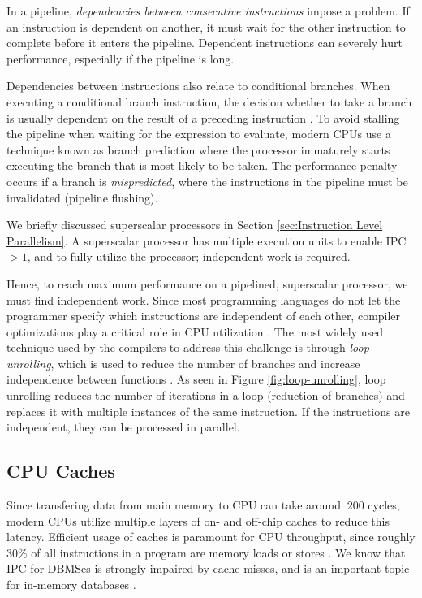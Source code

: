 In a pipeline, \textit{dependencies between consecutive instructions} impose a problem. If an instruction is dependent on another, it must wait for the other instruction to complete before it enters the pipeline. Dependent instructions can severely hurt performance, especially if the pipeline is long.

Dependencies between instructions also relate to conditional branches. When executing a conditional branch instruction, the decision whether to take a branch is usually dependent on the result of a preceding instruction \cite{Boncz2005-wj}. To avoid stalling the pipeline when waiting for the expression to evaluate, modern CPUs use a technique known as branch prediction where the processor immaturely starts executing the branch that is most likely to be taken. The performance penalty occurs if a branch is \textit{mispredicted}, where the instructions in the pipeline must be invalidated (pipeline flushing).

We briefly discussed superscalar processors in Section \ref{sec:Instruction Level Parallelism}. A superscalar processor has multiple execution units to enable IPC $> 1$, and to fully utilize the processor; independent work is required.

Hence, to reach maximum performance on a pipelined, superscalar processor, we must find independent work. Since most programming languages do not let the programmer specify which instructions are independent of each other, compiler optimizations play a critical role in CPU utilization \cite{Boncz2005-wj}. The most widely used technique used by the compilers to address this challenge is through \textit{loop unrolling}, which is used to reduce the number of branches and increase independence between functions \cite{Wikipedia_contributors2015-zc}. As seen in Figure \ref{fig:loop-unrolling}, loop unrolling reduces the number of iterations in a loop (reduction of branches) and replaces it with multiple instances of the same instruction. If the instructions are independent, they can be processed in parallel.

\subsection{CPU Caches}
\label{sub:CPU Caches}
Since transfering data from main memory to CPU can take around $~200$ cycles, modern CPUs utilize multiple layers of on- and off-chip caches to reduce this latency. Efficient usage of caches is paramount for CPU throughput, since roughly 30\% of all instructions in a program are memory loads or stores \cite{Boncz2005-wj}. We know that IPC for DBMSes is strongly impaired by cache misses, and is an important topic for in-memory databases \cite{Exasol2014-xh}.

